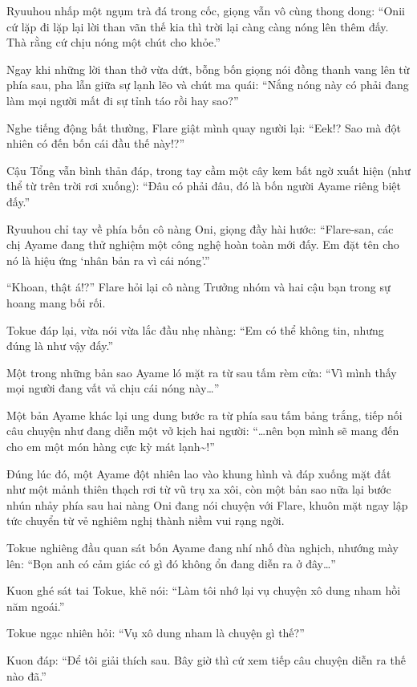 \documentclass[../main.tex]{subfiles}
\begin{document}
Ryuuhou nhấp một ngụm trà đá trong cốc, giọng vẫn vô cùng thong dong: ``Onii cứ lặp đi lặp lại lời than vãn thế kia thì trời lại càng càng nóng lên thêm đấy. Thà rằng cứ chịu nóng một chút cho khỏe.''

Ngay khi những lời than thở vừa dứt, bỗng bốn giọng nói đồng thanh vang lên từ phía sau, pha lẫn giữa sự lạnh lẽo và chút ma quái: ``Nắng nóng này có phải đang làm mọi người mất đi sự tỉnh táo rồi hay sao?''


Nghe tiếng động bất thường, Flare giật mình quay người lại: ``Eek!? Sao mà đột nhiên có đến bốn cái đầu thế này!?''

Cậu Tổng vẫn bình thản đáp, trong tay cầm một cây kem bất ngờ xuất hiện (như thể từ trên trời rơi xuống): ``Đâu có phải đâu, đó là bốn người Ayame riêng biệt đấy.''

Ryuuhou chỉ tay về phía bốn cô nàng Oni, giọng đầy hài hước: ``Flare-san, các chị Ayame đang thử nghiệm một công nghệ hoàn toàn mới đấy. Em đặt tên cho nó là hiệu ứng `nhân bản ra vì cái nóng'.''

``Khoan, thật á!?'' Flare hỏi lại cô nàng Trưởng nhóm và hai cậu bạn trong sự hoang mang bối rối.

Tokue đáp lại, vừa nói vừa lắc đầu nhẹ nhàng: ``Em có thể không tin, nhưng đúng là như vậy đấy.''

Một trong những bản sao Ayame ló mặt ra từ sau tấm rèm cửa: ``Vì mình thấy mọi người đang vất vả chịu cái nóng này\dots''

Một bản Ayame khác lại ung dung bước ra từ phía sau tấm bảng trắng, tiếp nối câu chuyện như đang diễn một vở kịch hai người: ``\dots nên bọn mình sẽ mang đến cho em một món hàng cực kỳ mát lạnh\~{}!''

Đúng lúc đó, một Ayame đột nhiên lao vào khung hình và đáp xuống mặt đất như một mảnh thiên thạch rơi từ vũ trụ xa xôi, còn một bản sao nữa lại bước nhún nhảy phía sau hai nàng Oni đang nói chuyện với Flare, khuôn mặt ngay lập tức chuyển từ vẻ nghiêm nghị thành niềm vui rạng ngời.

Tokue nghiêng đầu quan sát bốn Ayame đang nhí nhố đùa nghịch, nhướng mày lên: ``Bọn anh có cảm giác có gì đó không ổn đang diễn ra ở đây\dots''

Kuon ghé sát tai Tokue, khẽ nói: ``Làm tôi nhớ lại vụ chuyện xô dung nham hồi năm ngoái.''

Tokue ngạc nhiên hỏi: ``Vụ xô dung nham là chuyện gì thế?''

Kuon đáp: ``Để tôi giải thích sau. Bây giờ thì cứ xem tiếp câu chuyện diễn ra thế nào đã.''
\end{document}
